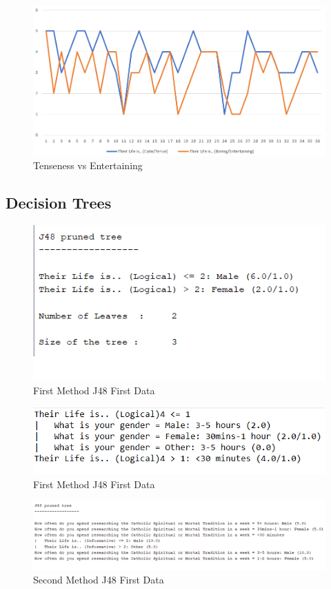 \documentclass[12pt]{article}
\begin{document}
\begin{figure}[h]
\caption{Tenseness vs Entertaining}
\label{tab:TensenessvsEntertaining}
 \centering
 \includegraphics[scale=0.75]{Tenseness vs Entertaining.png}
\end{figure}

\pagebreak

\subsection{Decision Trees}

\begin{figure}[h]
\caption{First Method J48 First Data}
\label{tab:FirstMethodJ481}
 \centering
 \includegraphics[scale=0.75]{First Method J48 1.png}
\end{figure}

\begin{figure}[h]
\caption{First Method J48 First Data}
\label{tab:FirstMethodJ481}
 \centering
 \includegraphics[scale=0.75]{First Method J48 2.png}
\end{figure}

\begin{figure}[h]
\caption{Second Method J48 First Data}
\label{tab:FirstMethodJ481}
 \centering
 \includegraphics[scale=0.75]{Second Method J48 1.png}
\end{figure}
\end{document}
